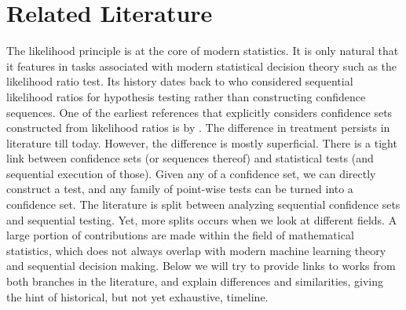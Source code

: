 \section{Related Literature}\label{sec:literature}
The likelihood principle is at the core of modern statistics. It is only natural that it features in tasks associated with modern statistical decision theory such as the likelihood ratio test. Its history dates back to \cite{wald1945sequential} who considered sequential likelihood ratios for hypothesis testing rather than constructing confidence sequences. One of the earliest references that explicitly considers confidence sets constructed from likelihood ratios is by \citet{darling1968some,robbins1970statistical}. The difference in treatment persists in literature till today. However, the difference is mostly superficial. There is a tight link between confidence sets (or sequences thereof) and statistical tests (and sequential execution of those). Given any of a confidence set, we can directly construct a test, and any family of point-wise tests can be turned into a confidence set. The literature is split between analyzing sequential confidence sets and sequential testing. Yet, more splits occurs when we look at different fields.  A large portion of contributions are made within the field of mathematical statistics, which does not always overlap with modern machine learning theory and sequential decision making. Below we will try to provide links to works from both branches in the literature, and explain differences and similarities, giving the hint of historical, but not yet exhaustive, timeline. 


